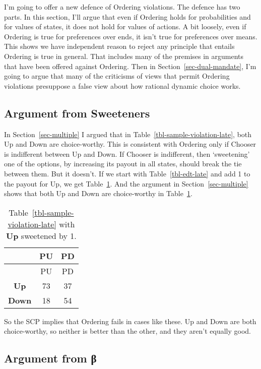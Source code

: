 \documentclass[
  11pt,
  letterpaper,
  DIV=11,
  numbers=noendperiod,
  twoside]{scrartcl}
\begin{document}
I'm going to offer a new defence of Ordering violations. The defence has
two parts. In this section, I'll argue that even if Ordering holds for
probabilities and for values of states, it does not hold for values of
actions. A bit loosely, even if Ordering is true for preferences over
ends, it isn't true for preferences over means. This shows we have
independent reason to reject any principle that entails Ordering is true
in general. That includes many of the premises in arguments that have
been offered against Ordering. Then in Section~\ref{sec-dual-mandate},
I'm going to argue that many of the criticisms of views that permit
Ordering violations presuppose a false view about how rational dynamic
choice works.

\subsection{Argument from Sweeteners}\label{sec-sweeteners}

In Section~\ref{sec-multiple} I argued that in
Table~\ref{tbl-sample-violation-late}, both Up and Down are
choice-worthy. This is consistent with Ordering only if Chooser is
indifferent between Up and Down. If Chooser is indifferent, then
`sweetening' one of the options, by increasing its payout in all states,
should break the tie between them. But it doesn't. If we start with
Table~\ref{tbl-edt-late} and add 1 to the payout for Up, we get
Table~\ref{tbl-sweetened}. And the argument in
Section~\ref{sec-multiple} shows that both Up and Down are choice-worthy
in Table~\ref{tbl-sweetened}.

\begin{longtable}[]{@{}ccc@{}}
\caption{Table~\ref{tbl-sample-violation-late} with \textbf{Up}
sweetened by 1.}\label{tbl-sweetened}\tabularnewline
\toprule\noalign{}
& PU & PD \\
\midrule\noalign{}
\endfirsthead
\toprule\noalign{}
& PU & PD \\
\midrule\noalign{}
\endhead
\bottomrule\noalign{}
\endlastfoot
\textbf{Up} & 73 & 37 \\
\textbf{Down} & 18 & 54 \\
\end{longtable}

So the SCP implies that Ordering fails in cases like these. Up and Down
are both choice-worthy, so neither is better than the other, and they
aren't equally good.

\subsection{Argument from β}\label{sec-ux3b2}
\end{document}
